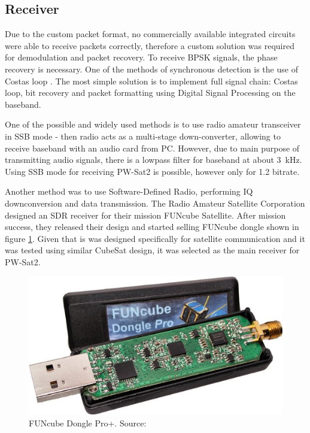 \subsection{Receiver}
Due to the custom packet format, no commercially available integrated circuits were able to receive packets correctly, therefore a custom solution was required for demodulation and packet recovery.
To receive BPSK signals, the phase recovery is necessary. One of the methods of synchronous detection is the use of Costas loop \cite{costas_loop}. The most simple solution is to implement full signal chain: Costas loop, bit recovery and packet formatting using Digital Signal Processing on the baseband.

One of the possible and widely used methods is to use radio amateur transceiver in SSB mode - then radio acts as a multi-stage down-converter, allowing to receive baseband with an audio card from PC. However, due to main purpose of transmitting audio signals, there is a lowpass filter for baseband at about \SI{3}{\kHz}. Using SSB mode for receiving PW-Sat2 is possible, however only for \SI{1.2}{\kbps} bitrate.

Another method was to use Software-Defined Radio, performing IQ downconversion and data transmission. The Radio Amateur Satellite Corporation designed an SDR receiver for their mission FUNcube Satellite. After mission success, they released their design and started selling FUNcube dongle shown in figure \ref{funcube_pic}. Given that is was designed specifically for satellite communication and it was tested using similar CubeSat design, it was selected as the main receiver for PW-Sat2.

\begin{figure}[H]
    \centering
    \includegraphics[width=0.6\paperwidth]{img/4/funcube.jpg}
    \caption{FUNcube Dongle Pro+. Source: \cite{funcube}}
    \label{funcube_pic}
\end{figure}


